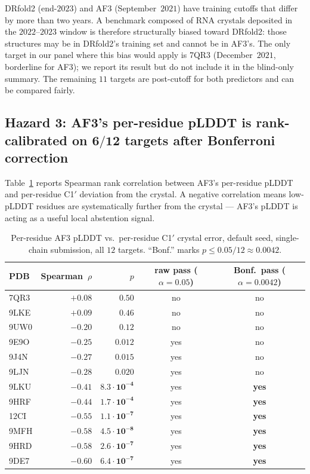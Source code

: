 \documentclass[11pt,a4paper]{article}
\begin{document}
DRfold2 (end-$2023$) and AF3 (September~$2021$) have training
cutoffs that differ by more than two years. A benchmark composed of
RNA crystals deposited in the $2022$--$2023$ window is therefore
structurally biased toward DRfold2: those structures may be in
DRfold2's training set and cannot be in AF3's. The only target in
our panel where this bias would apply is 7QR3 (December~$2021$,
borderline for AF3); we report its result but do not include it in
the blind-only summary. The remaining $11$ targets are post-cutoff
for both predictors and can be compared fairly.

\subsection{Hazard 3: AF3's per-residue pLDDT is rank-calibrated on
$\mathbf{6/12}$ targets after Bonferroni correction}
\label{sec:calib}

Table~\ref{tab:calib} reports Spearman rank correlation between AF3's
per-residue pLDDT and per-residue C1$'$ deviation from the crystal.
A negative correlation means low-pLDDT residues are systematically
further from the crystal --- AF3's pLDDT is acting as a useful local
abstention signal.

\begin{table}[h!]
\centering
\caption{Per-residue AF3 pLDDT vs.~per-residue C1$'$ crystal error,
default seed, single-chain submission, all $12$ targets. ``Bonf.''
marks $p \leq 0.05/12 \approx 0.0042$.}
\label{tab:calib}
\small
\begin{tabular}{lrrcc}
\toprule
PDB & Spearman~$\rho$ & $p$ & raw pass ($\alpha=0.05$) & Bonf.\ pass ($\alpha=0.0042$) \\
\midrule
7QR3 & $+0.08$ & $0.50$    & no  & no \\
9LKE & $+0.09$ & $0.46$    & no  & no \\
9UW0 & $-0.20$ & $0.12$    & no  & no \\
9E9O & $-0.25$ & $0.012$   & yes & no \\
9J4N & $-0.27$ & $0.015$   & yes & no \\
9LJN & $-0.28$ & $0.020$   & yes & no \\
9LKU & $\mathbf{-0.41}$ & $\mathbf{8.3\!\cdot\!10^{-4}}$ & yes & \textbf{yes} \\
9HRF & $\mathbf{-0.44}$ & $\mathbf{1.7\!\cdot\!10^{-4}}$ & yes & \textbf{yes} \\
12CI & $\mathbf{-0.55}$ & $\mathbf{1.1\!\cdot\!10^{-7}}$ & yes & \textbf{yes} \\
9MFH & $\mathbf{-0.58}$ & $\mathbf{4.5\!\cdot\!10^{-8}}$ & yes & \textbf{yes} \\
9HRD & $\mathbf{-0.58}$ & $\mathbf{2.6\!\cdot\!10^{-7}}$ & yes & \textbf{yes} \\
9DE7 & $\mathbf{-0.60}$ & $\mathbf{6.4\!\cdot\!10^{-7}}$ & yes & \textbf{yes} \\
\bottomrule
\end{tabular}
\end{table}
\end{document}
